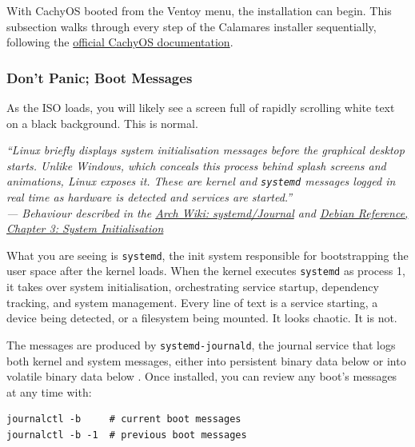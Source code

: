 \documentclass{article}
\newcommand{\code}[1]{\colorbox{codebg}{\texttt{#1}}}
\begin{document}
With CachyOS booted from the Ventoy menu, the installation can begin. This subsection walks through every step of the Calamares installer sequentially, following the
\href{https://wiki.cachyos.org}{official CachyOS documentation}.

\subsubsection{Don't Panic; Boot Messages}\label{ssub:dont_panic}

As the ISO loads, you will likely see a screen full of rapidly scrolling white text on a black background. This is normal.  

\begin{mdframed}[linewidth=1.5pt, linecolor=black!50, topline=true, bottomline=true,
  leftline=false, rightline=false, backgroundcolor=black!3]
  \small\itshape
  ``Linux briefly displays system initialisation messages before the graphical desktop
  starts. Unlike Windows, which conceals this process behind splash screens and
  animations, Linux exposes it. These are kernel and \code{systemd} messages logged
  in real time as hardware is detected and services are started.''\\[4pt]
  \normalfont\small --- Behaviour described in the
  \href{https://wiki.archlinux.org/title/Systemd/Journal}{Arch Wiki: systemd/Journal}
  and \href{https://www.debian.org/doc/manuals/debian-reference/ch03.en.html}{Debian
  Reference, Chapter 3: System Initialisation}
\end{mdframed}

\noindent What you are seeing is \code{systemd}, the init system responsible for bootstrapping the user space after the kernel loads. When the kernel executes \code{systemd} as process 1, it takes over system initialisation,
orchestrating service startup, dependency tracking, and system management. Every line of text is a service starting, a device being detected, or a filesystem
being mounted. It looks chaotic. It is not.

The messages are produced by \code{systemd-journald}, the journal service that
logs both kernel and system messages, either into persistent binary
data below  or into volatile binary data below
. Once installed, you can review any boot's
messages at any time with: \begin{verbatim}
journalctl -b     # current boot messages
journalctl -b -1  # previous boot messages
\end{verbatim}
\end{document}
